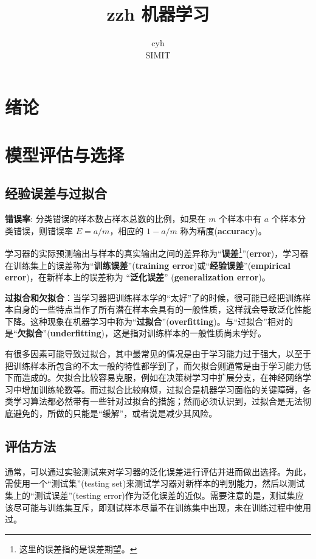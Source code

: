 \documentclass[cn,hazy,black,normal]{elegantnote}
\title{zzh 机器学习}
\author{cyh \\ 
	SIMIT}
\date{\zhdate{2021/9/22}}
\numberwithin{equation}{section}
\numberwithin{figure}{section}
\begin{document}
	\maketitle
	
	\newpage
	
	\tableofcontents
	
	\newpage
	
	\section{绪论}
	
	\section{模型评估与选择}
		\subsection{经验误差与过拟合}
			\textbf{错误率}: 分类错误的样本数占样本总数的比例，如果在 $m$ 个样本中有 $a$ 个样本分类错误，则错误率 $E = a / m$，相应的 $1 - a / m$ 称为精度(\textbf{accuracy})。
	
			学习器的实际预测输出与样本的真实输出之间的差异称为“\textbf{误差}\footnote{这里的误差指的是误差期望。}”(\textbf{error})，学习器在训练集上的误差称为“\textbf{训练误差}”(\textbf{training error})或“\textbf{经验误差}”(\textbf{empirical error})，在新样本上的误差称为 “\textbf{泛化误差}” (\textbf{generalization error})。
	
			\textbf{过拟合和欠拟合}：当学习器把训练样本学的“太好”了的时候，很可能已经把训练样本自身的一些特点当作了所有潜在样本会具有的一般性质，这样就会导致泛化性能下降。这种现象在机器学习中称为“\textbf{过拟合}”(\textbf{overfitting})。与“过拟合”相对的是“\textbf{欠拟合}”(\textbf{underfitting})，这是指对训练样本的一般性质尚未学好。
	
			有很多因素可能导致过拟合，其中最常见的情况是由于学习能力过于强大，以至于把训练样本所包含的不太一般的特性都学到了，而欠拟合则通常是由于学习能力低下而造成的。欠拟合比较容易克服，例如在决策树学习中扩展分支，在神经网络学习中增加训练轮数等。而过拟合比较麻烦，过拟合是机器学习面临的关键障碍，各类学习算法都必然带有一些针对过拟合的措施；然而必须认识到，过拟合是无法彻底避免的，所做的只能是“缓解”，或者说是减少其风险。 

		\subsection{评估方法}
			通常，可以通过实验测试来对学习器的泛化误差进行评估并进而做出选择。为此，需使用一个“测试集”(testing set)来测试学习器对新样本的判别能力，然后以测试集上的“测试误差”(testing error)作为泛化误差的近似。需要注意的是，测试集应该尽可能与训练集互斥，即测试样本尽量不在训练集中出现，未在训练过程中使用过。
			
\end{document}
